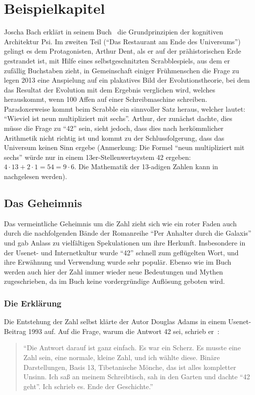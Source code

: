 \chapter{Beispielkapitel}
Joscha Bach erklärt in seinem Buch~\cite{Bach:2009:PSI:1611304} die Grundprinzipien der kognitiven Architektur Psi. Im zweiten Teil ("`Das Restaurant am Ende des
Universums"') gelingt es dem Protagonisten, Arthur Dent, als er
auf der prähistorischen Erde gestrandet ist, mit Hilfe eines
selbstgeschnitzten Scrabblespiels, aus dem er zufällig Buchstaben
zieht, in Gemeinschaft einiger Frühmenschen die Frage zu legen 2013
eine Anspielung auf ein plakatives Bild der Evolutionstheorie, bei dem
das Resultat der Evolution mit dem Ergebnis verglichen wird, welches
herauskommt, wenn 100 Affen auf einer Schreibmaschine schreiben.
Paradoxerweise kommt beim Scrabble ein sinnvoller Satz heraus, welcher
lautet: "`Wieviel ist neun multipliziert mit sechs"'. Arthur,
der zunächst dachte, dies müsse die Frage zu "`42"' sein,
sieht jedoch, dass dies nach herkömmlicher Arithmetik nicht richtig
ist und kommt zu der Schlussfolgerung, dass das Universum keinen Sinn
ergebe (Anmerkung: Die Formel "`neun multipliziert mit sechs"'
würde nur in einem 13er-Stellenwertsystem 42 ergeben: $4 \cdot 13 + 2
\cdot 1 = 54
= 9 \cdot 6$. Die Mathematik der 13-adigen Zahlen kann in~\cite{hensel1897} nachgelesen werden).

\section{Das Geheimnis}
Das vermeintliche Geheimnis um die Zahl zieht sich wie ein roter Faden
auch durch die nachfolgenden Bände der Romanreihe "`Per Anhalter durch
die Galaxis"' und gab Anlass zu vielfältigen Spekulationen um ihre
Herkunft. Insbesondere in der Usenet- und Internetkultur wurde "`42"'
schnell zum geflügelten Wort, und ihre Erwähnung und Verwendung wurde
sehr populär. Ebenso wie im Buch werden auch hier der Zahl immer
wieder neue Bedeutungen und Mythen zugeschrieben, da im Buch keine
vordergründige Auflösung geboten wird.

\subsection{Die Erklärung}
Die Entstehung der Zahl selbst klärte der Autor Douglas Adams in einem
Usenet-Beitrag 1993 auf. Auf die Frage, warum die Antwort 42 sei,
schrieb er~\cite{hensel1897}:

\begin{quote}
  "`Die Antwort darauf ist ganz einfach. Es war ein Scherz. Es musste
  eine Zahl sein, eine normale, kleine Zahl, und ich wählte diese.
  Binäre Darstellungen, Basis 13, Tibetanische Mönche, das ist alles
  kompletter Unsinn. Ich saß an meinem Schreibtisch, sah in den Garten
  und dachte "`42 geht"'. Ich schrieb es. Ende der Geschichte."'
\end{quote}

